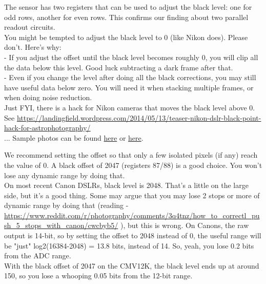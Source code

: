 The sensor has two registers that can be used to adjust the black level: one for odd rows, another for even rows. This confirms our finding about two parallel readout circuits.\\

You might be tempted to adjust the black level to 0 (like Nikon does). Please don't. Here's why:\\

- If you adjust the offset until the black level becomes roughly 0, you will clip all the data below this level. Good luck subtracting a dark frame after that.\\
- Even if you change the level after doing all the black corrections, you may still have useful data below zero. You will need it when stacking multiple frames, or when doing noise reduction.\\

Just FYI, there is a hack for Nikon cameras that moves the black level above 0. See \href{https://landingfield.wordpress.com/2014/05/13/teaser-nikon-dslr-black-point-hack-for-astrophotography/}{https://landingfield.wordpress.com/2014/05/13/teaser-nikon-dslr-black-point-hack-for-astrophotography/} \\

... Sample photos can be found \href{https://www.cloudynights.com/topic/473696-rho-ophiuchi-with-nikon-hacked-black-level/}{here} or \href{https://nikonhacker.com/viewtopic.php?t=2548&p=18449#p17973}{here}.

We recommend setting the offset so that only a few isolated pixels (if any) reach the value of 0. A black offset of 2047 (registers 87/88) is a good choice. You won't lose any dynamic range by doing that.\\

On most recent Canon DSLRs, black level is 2048. That's a little on the large side, but it's a good thing. Some may argue that you may lose 2 stops or more of dynamic range by doing that (reading - \href{https://www.reddit.com/r/photography/comments/3q4tnz/how_to_correctly_push_5_stops_with_canon/cwcbyb5/}{https://www.reddit.com/r/photography/comments/3q4tnz/how\_to\_correctl\_push\_5\_stops\_with\_canon/cwcbyb5/} ), but this is wrong. On Canons, the raw output is 14-bit, so by setting the offset to 2048 instead of 0, the useful range will be "just" log2(16384-2048) = 13.8 bits, instead of 14. So, yeah, you lose 0.2 bits from the ADC range.\\

With the black offset of 2047 on the CMV12K, the black level ends up at around 150, so you lose a whooping 0.05 bits from the 12-bit range.\\

